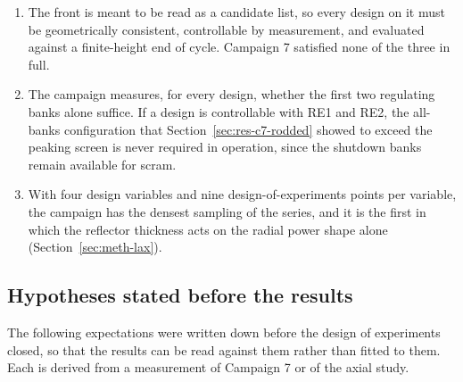 \begin{enumerate}
  \item The front is meant to be read as a candidate list, so every
        design on it must be geometrically consistent, controllable by
        measurement, and evaluated against a finite-height end of
        cycle. Campaign 7 satisfied none of the three in full.

  \item The campaign measures, for every design, whether the first two
        regulating banks alone suffice. If a design is controllable
        with RE1 and RE2, the all-banks configuration that
        Section~\ref{sec:res-c7-rodded} showed to exceed the peaking
        screen is never required in operation, since the shutdown banks
        remain available for scram.

  \item With four design variables and nine design-of-experiments
        points per variable, the campaign has the densest sampling of
        the series, and it is the first in which the reflector
        thickness acts on the radial power shape alone
        (Section~\ref{sec:meth-lax}).
\end{enumerate}

\subsection{Hypotheses stated before the results}
\label{sec:res-c8-hyp}

The following expectations were written down before the design of
experiments closed, so that the results can be read against them
rather than fitted to them. Each is derived from a measurement of
Campaign 7 or of the axial study.

